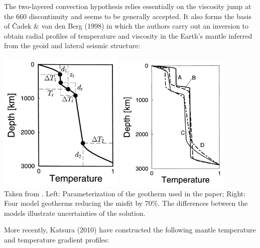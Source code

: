 The two-layered convection hypothesis relies essentially 
on the viscosity jump at the 660 discontinuity and seems 
to be generally accepted.
It also forms the basis of {\v{C}}adek \& van den Berg (1998) \cite{cava98}
in which the authors carry out an inversion to obtain 
radial profiles of temperature and viscosity in the Earth’s mantle
inferred from the geoid and lateral seismic structure:
\begin{center}
\includegraphics[width=6cm]{images/adiabatic/cava98a.png}
\includegraphics[width=5.5cm]{images/adiabatic/cava98b.png}\\
{\captionfont Taken from \cite{cava98}. 
Left: Parameterization of the geotherm used in the paper;
Right: Four model geotherms reducing the misfit by 70\%. The
differences between the models illustrate uncertainties of the
solution.}
\end{center}

More recently, Katsura \etal (2010) \cite{kayy10} have constructed the following mantle temperature 
and temperature gradient profiles:


